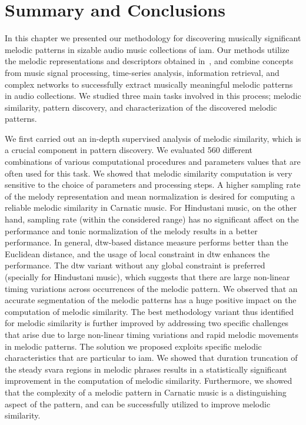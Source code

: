 {\section{Summary and Conclusions}
\label{sec:conclusions_patterns}

In this chapter we presented our methodology for discovering musically significant melodic patterns in sizable audio music collections of \gls{iam}. Our methods utilize the melodic representations and descriptors obtained in~, and combine concepts from music signal processing, time-series analysis, information retrieval, and complex networks to successfully extract musically meaningful melodic patterns in audio collections. We studied three main tasks involved in this process; melodic similarity, pattern discovery, and characterization of the discovered melodic patterns. 

We first carried out an in-depth supervised analysis of melodic similarity, which is a crucial component in pattern discovery. We evaluated 560 different combinations of various computational procedures and parameters values that are often used for this task. We showed that melodic similarity computation is very sensitive to the choice of parameters and processing steps. A higher sampling rate of the melody representation and mean normalization is desired for computing a reliable melodic similarity in Carnatic music. For Hindustani music, on the other hand, sampling rate (within the considered range) has no significant affect on the performance and tonic normalization of the melody results in a better performance. In general, \gls{dtw}-based distance measure performs better than the Euclidean distance, and the usage of local constraint in \gls{dtw} enhances the performance. The \gls{dtw} variant without any global constraint is preferred (specially for Hindustani music), which suggests that there are large non-linear timing variations across occurrences of the melodic pattern. We observed that an accurate segmentation of the melodic patterns has a huge positive impact on the computation of melodic similarity. The best methodology variant thus identified for melodic similarity is further improved by addressing two specific challenges that arise due to large non-linear timing variations and rapid melodic movements in melodic patterns. The solution we proposed exploits specific melodic characteristics that are particular to \gls{iam}. We showed that duration truncation of the steady \gls{svara} regions in melodic phrases results in a statistically significant improvement in the computation of melodic similarity. Furthermore, we showed that the complexity of a melodic pattern in Carnatic music is a distinguishing aspect of the pattern, and can be successfully utilized to improve melodic similarity.

}
